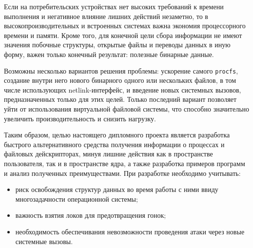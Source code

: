 Если на потребительских устройствах нет высоких требований к времени выполнения
и негативное влияние лишних действий незаметно, то в высокопроизводительных и
встроенных системах важна экономия процессорного времени и памяти. Кроме того,
для конечной цели сбора информации не имеют значения побочные структуры,
открытые файлы и переводы данных в иную форму, важен только конечный результат:
полезные бинарные данные.

Возможны несколько вариантов решения проблемы: ускорение самого \texttt{procfs},
создание внутри него нового бинарного одного или нескольких файлов, в том числе
использующих netlink-интерфейс, и введение новых системных вызовов,
предназначенных только для этих целей. Только последний вариант позволяет уйти
от использования виртуальной файловой системы, что способно значительно
увеличить производительность и снизить нагрузку.

Таким образом, целью настоящего дипломного проекта является разработка быстрого
альтернативного средства получения информации о процессах и файловых
дейскрипторах, минуя лишние действия как в пространстве пользователя, так и в
пространстве ядра, а также разработка примеров программ и анализ полученных
преимуществами. При разработке необходимо учитывать:
\begin{itemize}
\item риск освобождения структур данных во время работы с ними ввиду
  многозадачности операционной системы;
\item важность взятия локов для предотвращения гонок;
\item необходимость обеспечивания невозможности проведения атаки через новые
  системные вызовы.
\end{itemize}
